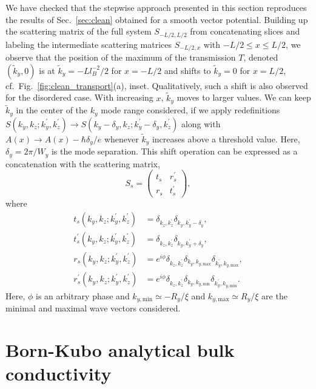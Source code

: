 \documentclass[aps,prb,10pt,amsmath,amssymb,twocolumn,floatfix,superscriptaddress,showpacs,numerical,footinbib]{revtex4-1}
\begin{document}
We have checked that the stepwise approach presented in this section reproduces the results of Sec.~\ref{sec:clean} obtained for a smooth vector potential.
%
Building up the scattering matrix of the full system $S_{-L/2,L/2}$ from concatenating slices and labeling the intermediate scattering matrices $S_{-L/2,x}$ with $-L/2 \leq x \leq L/2$, we observe that the position of the maximum of the transmission $T$, denoted $(\tilde{k}_y,0)$ is at $\tilde{k}_y=-L l_B^{-2}/2$ for $x=-L/2$ and shifts to $\tilde{k}_y=0$ for $x=L/2$, cf.\ Fig.~\ref{fig:clean_transport}(a), inset.
%
Qualitatively, such a shift is also observed for the disordered case.
%
With increasing $x$, $\tilde{k}_y$ moves to larger values.
%
We can keep $\tilde{k}_y$ in the center of the $k_y$ mode range considered, if we apply redefinitions $S\left(k_{y},k_{z};k_{y}^{\prime},k_{z}^{\prime}\right) \to S \left(k_{y} - \delta_{y},k_{z}; k_{y}^{\prime}- \delta_{y}, k_{z}^{\prime}\right)$ along with $A(x)\to A(x)-\hbar\delta_{y}/e$ whenever $\tilde{k}_y$ increases above a threshold value.
%
Here, $\delta_y=2\pi/W_y$ is the mode separation.
%
This shift operation can be expressed as a concatenation with the scattering matrix,\cite{BardarsonMong}
%
\begin{equation}
S_{s}= \begin{pmatrix}
t_{s} & r_{s}^{\prime}\\
r_{s} & t_{s}^{\prime}
\end{pmatrix},
\end{equation} where
\begin{align*}
t_{s}(k_{y},k_{z};k_{y}^{\prime},k_{z}^{\prime}) & = \delta_{k_{z},k_{z}^{\prime}}\delta_{k_{y},k_{y}^{\prime}-\delta_{y}},\\
t_{s}^{\prime}(k_{y},k_{z};k_{y}^{\prime},k_{z}^{\prime}) & = \delta_{k_{z},k_{z}^{\prime}}\delta_{k_{y},k_{y}^{\prime}+\delta_{y}},\\
r_{s}(k_{y},k_{z};k_{y}^{\prime},k_{z}^{\prime}) & = e^{i\phi}\delta_{k_{z},k_{z}^{\prime}}\delta_{k_{y},k_{y,\mathrm{max}}}\delta_{k_{y}^{\prime},k_{y,\mathrm{max}}},\\
r_{s}^{\prime}(k_{y},k_{z};k_{y}^{\prime},k_{z}^{\prime}) & = e^{i\phi}\delta_{k_{z},k_{z}^{\prime}}\delta_{k_{y},k_{y,\mathrm{min}}}\delta_{k_{y}^{\prime},k_{y,\mathrm{min}}}.
\end{align*}
Here, $\phi$ is an arbitrary phase and $k_{y,\mathrm{min}}\simeq -R_y/\xi$ and $k_{y,\mathrm{max}}\simeq R_y/\xi$ are the minimal and maximal wave vectors considered.

\section{Born-Kubo analytical bulk conductivity \label{sec:Born-Kubo}}
\end{document}
